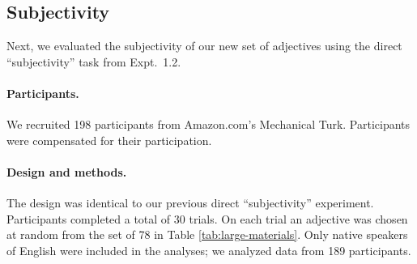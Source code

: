 \documentclass[manuscript]{stjour}
\begin{document}

\subsection{Subjectivity}

Next, we evaluated the subjectivity of our new set of adjectives using the direct ``subjectivity'' task from Expt.~1.2.

\paragraph{Participants.}

We recruited 198 participants from Amazon.com's Mechanical Turk. Participants were compensated for their participation.

\paragraph{Design and methods.}

The design was identical to our previous direct ``subjectivity'' experiment. 
Participants completed a total of 30 trials. On each trial an adjective was chosen at random from the set of 78 in Table \ref{tab:large-materials}.  Only native speakers of English 
were included in the analyses; we analyzed data from 189 participants.
\end{document}
